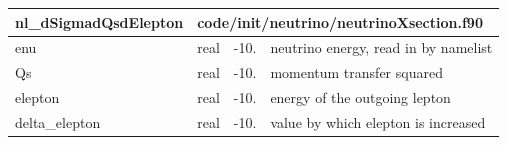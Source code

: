 \documentclass{article}
\begin{document}
\begin{longtable}{llll}
\toprule
\textbf{\large{nl\_dSigmadQsdElepton}} & \multicolumn{3}{l}{\footnotesize{code/init/neutrino/neutrinoXsection.f90}}\\*
\midrule
\endfirsthead
\midrule
\endhead
enu & \begin{minipage}[t]{2cm}real\end{minipage} & \begin{minipage}[t]{2cm}-10.\end{minipage} & \begin{minipage}[t]{12cm}neutrino energy, read in by namelist\end{minipage}\\*
\midrule
Qs & \begin{minipage}[t]{2cm}real\end{minipage} & \begin{minipage}[t]{2cm}-10.\end{minipage} & \begin{minipage}[t]{12cm}momentum transfer squared\end{minipage}\\*
\midrule
elepton & \begin{minipage}[t]{2cm}real\end{minipage} & \begin{minipage}[t]{2cm}-10.\end{minipage} & \begin{minipage}[t]{12cm}energy of the outgoing lepton\end{minipage}\\*
\midrule
delta\_elepton & \begin{minipage}[t]{2cm}real\end{minipage} & \begin{minipage}[t]{2cm}-10.\end{minipage} & \begin{minipage}[t]{12cm}value by which elepton is increased\end{minipage}\\*
\bottomrule
\end{longtable}
{ }



\end{document}
